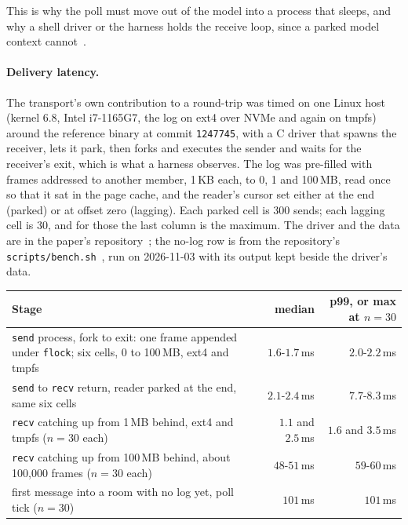 \documentclass[11pt]{article}
\newcommand{\code}[1]{\texttt{#1}}
\begin{document}
This is why the poll must move out of the model into a process that sleeps, and why a shell driver or the harness holds the receive loop, since a parked model context cannot~\cite{repo}.

\paragraph{Delivery latency.} The transport's own contribution to a round-trip was timed on one Linux host (kernel 6.8, Intel i7-1165G7, the log on ext4 over NVMe and again on tmpfs) around the reference binary at commit \code{1247745}, with a C driver that spawns the receiver, lets it park, then forks and executes the sender and waits for the receiver's exit, which is what a harness observes. The log was pre-filled with frames addressed to another member, 1\,KB each, to 0, 1 and 100\,MB, read once so that it sat in the page cache, and the reader's cursor set either at the end (parked) or at offset zero (lagging). Each parked cell is 300 sends; each lagging cell is 30, and for those the last column is the maximum. The driver and the data are in the paper's repository~\cite{tokenbill}; the no-log row is from the repository's \code{scripts/bench.sh}~\cite{repo}, run on 2026-11-03 with its output kept beside the driver's data.

\begin{center}
\begin{tabular}{@{}p{8.9cm} r r@{}}
\toprule
Stage & median & p99, or max at $n=30$ \\
\midrule
\code{send} process, fork to exit: one frame appended under \code{flock}; six cells, 0 to 100\,MB, ext4 and tmpfs & $1.6$-$1.7$\,ms & $2.0$-$2.2$\,ms \\
\code{send} to \code{recv} return, reader parked at the end, same six cells & $2.1$-$2.4$\,ms & $7.7$-$8.3$\,ms \\
\code{recv} catching up from 1\,MB behind, ext4 and tmpfs ($n=30$ each) & $1.1$ and $2.5$\,ms & $1.6$ and $3.5$\,ms \\
\code{recv} catching up from 100\,MB behind, about 100,000 frames ($n=30$ each) & $48$-$51$\,ms & $59$-$60$\,ms \\
first message into a room with no log yet, poll tick ($n=30$) & $101$\,ms & $101$\,ms \\
\bottomrule
\end{tabular}
\end{center}
\end{document}
